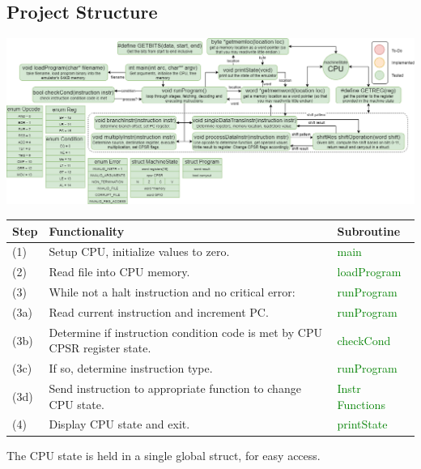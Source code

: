 \documentclass[11pt]{article}
\begin{document}
    \subsection*{Project Structure}
        \begin{center}
            \includegraphics[width = \textwidth]{project status}
        \end{center}
    \begin{center}
        \begin{tabular}{l l l}
            Step & Functionality & Subroutine \\
            \hline
            (1) & Setup CPU, initialize values to zero. & \textcolor{green}{main} \\
            (2) & Read file into CPU memory. & \textcolor{green}{loadProgram}\\
            (3) & While not a halt instruction and no critical error: & \textcolor{green}{runProgram} \\
            (3a) & Read current instruction and increment PC.  & \textcolor{green}{runProgram}\\
            (3b) & Determine if instruction condition code is met by CPU CPSR register state. & \textcolor{green}{checkCond}\\
            (3c) & If so, determine instruction type.  & \textcolor{green}{runProgram}\\
            (3d) & Send instruction to appropriate function to change CPU state. & \textcolor{green}{Instr Functions}\\
            (4) & Display CPU state and exit. & \textcolor{green}{printState} \\
        \end{tabular}
    \end{center}
    The CPU state is held in a single global struct, for easy access.


    
\end{document}
